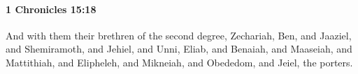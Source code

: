 
		\paragraph{1 Chronicles 15:18} %
			\label{1CHRONICLES-15-18}

			And with them their brethren of the second degree, Zechariah, Ben, and Jaaziel, and Shemiramoth, and Jehiel, and Unni, Eliab, and Benaiah, and Maaseiah, and Mattithiah, and Elipheleh, and Mikneiah, and Obededom, and Jeiel, the porters.



